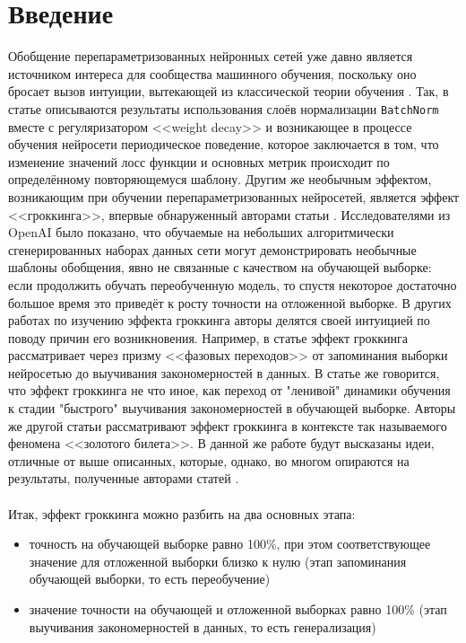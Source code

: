 \documentclass{article}
\begin{document}
\section{Введение}
Обобщение перепараметризованных нейронных сетей уже давно является источником интереса для
сообщества машинного обучения, поскольку оно бросает вызов интуиции, вытекающей из классической теории обучения \cite{double_descent, dd_avoid}. Так, в статье  \cite{on_periodic_beh} описываются результаты использования слоёв нормализации \verb|BatchNorm| \cite{batch_norm} вместе с регуляризатором <<weight decay>> \cite{weight_decay, decoupled_wd, gradient_reg} и возникающее в процессе обучения нейросети периодическое поведение, которое заключается в том, что изменение значений лосс функции и основных метрик происходит по определённому повторяющемуся шаблону. Другим же необычным эффектом, возникающим при обучении перепараметризованных нейросетей, является эффект <<гроккинга>>, впервые обнаруженный авторами статьи \cite{grokking_start}. Исследователями из OpenAI было показано, что обучаемые на небольших алгоритмически сгенерированных наборах данных сети могут демонстрировать необычные шаблоны обобщения, явно не связанные с качеством на обучающей выборке: если продолжить обучать переобученную модель, то спустя некоторое достаточно большое время это приведёт к росту точности на отложенной выборке. В других работах по изучению эффекта гроккинга авторы делятся своей интуицией по поводу причин его возникновения. Например, в статье \cite{phase_changes} эффект гроккинга рассматривает через призму <<фазовых переходов>> от запоминания выборки нейросетью до выучивания закономерностей в данных. В статье же \cite{lazy_grokking} говорится, что эффект гроккинга не что иное, как переход от "ленивой" динамики обучения к стадии "быстрого" выучивания закономерностей в обучающей выборке. Авторы же другой статьи \cite{grokking_tickets} рассматривают эффект гроккинга в контексте так называемого феномена <<золотого билета>>. В данной же работе будут высказаны идеи, отличные от выше описанных, которые, однако, во многом опираются на результаты, полученные авторами статей \cite{grokking_start, omnigrok}. \\\\
Итак, эффект гроккинга можно разбить на два основных этапа:
\begin{itemize}
    \item точность на обучающей выборке равно 100\%, при этом соответствующее значение для отложенной выборки близко к нулю (этап запоминания обучающей выборки, то есть переобучение)
    \item значение точности на обучающей и отложенной выборках равно 100\% (этап выучивания закономерностей в данных, то есть генерализация)
\end{itemize}
\end{document}
